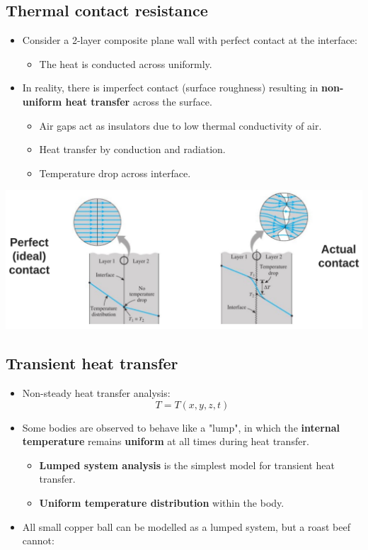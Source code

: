 \documentclass[11pt]{article}
\begin{document}
\subsection{Thermal contact resistance}
\label{sec:orgb044ee4}
\begin{itemize}
\item Consider a 2-layer composite plane wall with perfect contact at the interface:
\begin{itemize}
\item The heat is conducted across uniformly.
\end{itemize}
\item In reality, there is imperfect contact (surface roughness) resulting in \textbf{non-uniform heat transfer} across the surface.
\begin{itemize}
\item Air gaps act as insulators due to low thermal conductivity of air.
\item Heat transfer by conduction and radiation.
\item Temperature drop across interface.
\end{itemize}
\end{itemize}
\begin{center}
\includegraphics[width=.9\linewidth]{./images/thermal-contact-resistance.png}
\end{center}

\subsection{Transient heat transfer}
\label{sec:org96ed131}
\begin{itemize}
\item Non-steady heat transfer analysis:
\[T = T(x, y, z, t)\]
\item Some bodies are observed to behave like a "lump", in which the \textbf{internal temperature} remains \textbf{uniform} at all times during heat transfer.
\begin{itemize}
\item \textbf{Lumped system analysis} is the simplest model for transient heat transfer.
\item \textbf{Uniform temperature distribution} within the body.
\end{itemize}
\item All small copper ball can be modelled as a lumped system, but a roast beef cannot:
\end{itemize}
\end{document}
